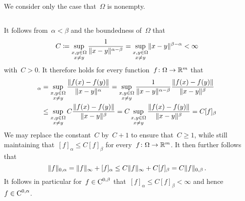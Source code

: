 \section{}

We consider only the case that~$\Omega$ is nonempty.





\subsection{}

It follows from~$\alpha < \beta$ and the boundedness of~$\Omega$ that
\[
            C
  \coloneqq  \sup_{\substack{x, y \in \Omega \\ x \neq y}}
            \frac{1}{\lVert x - y\rVert^{\alpha - \beta}}
  =         \sup_{\substack{x, y \in \Omega \\ x \neq y}}
            \lVert x - y\rVert^{\beta - \alpha}
  <         \infty
\]
with~$C > 0$.
It therefore holds for every function~$f \colon \Omega \to \mathbb{R}^m$ that
\begin{align*}
        [f]_{\alpha}
  &=    \sup_{\substack{x, y \in \Omega \\ x \neq y}}
        \frac{\norm{f(x) - f(y)}}{\norm{x - y}^\alpha}
   =    \sup_{\substack{x, y \in \Omega \\ x \neq y}}
        \frac{1}{\norm{x - y}^{\alpha - \beta}}
        \frac{\norm{f(x) - f(y)}}{\norm{x - y}^\beta} \\
  &\leq \sup_{\substack{x, y \in \Omega \\ x \neq y}}
        C
        \frac{\norm{f(x) - f(y)}}{\norm{x - y}^\beta}
   =    C
        \sup_{\substack{x, y \in \Omega \\ x \neq y}}
        \frac{\norm{f(x) - f(y)}}{\norm{x - y}^\beta}
   =    C [f]_{\beta}
\end{align*}
We may replace the constant~$C$ by~$C+1$ to ensure that~$C \geq 1$, while still maintaining that~$[f]_\alpha \leq C [f]_\beta$ for every~$f \colon \Omega \to \mathbb{R}^m$.
It then further follows that
\[
        \lVert f\rVert_{0,\alpha}
  =     \lVert f\rVert_\infty + [f]_\alpha
  \leq  C \lVert f\rVert_\infty + C [f]_\beta
  =     C \lVert f\rVert_{0,\beta} \,.
\]
It follows in particular for~$f \in \operatorname{C}^{0,\beta}$ that~$[f]_\alpha \leq C [f]_\beta < \infty$ and hence~$f \in \operatorname{C}^{0,\alpha}$.





\subsection{}

